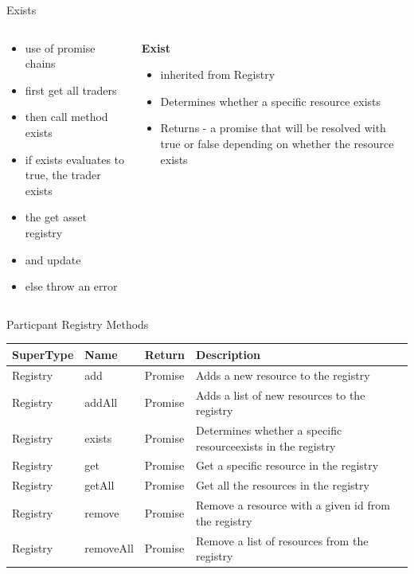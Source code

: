 \documentclass[pdf,table]{beamer}
\begin{document}
\begin{frame}{Exists}
	\begin{columns}[T]
		\begin{column}{0.48\textwidth}
			\begin{itemize}
				\item use of promise chains
				\item first get all traders
				\item then call method exists
				\item if exists evaluates to true, the trader exists
				\item the get asset registry 
				\item and update
				\item else throw an error
			\end{itemize}
		\end{column}
		\begin{column}{0.48\textwidth}
			{\bf Exist}
			\begin{itemize}
				\item inherited from Registry
				\item Determines whether a specific resource exists
				\item Returns - a promise that will be resolved with true or false depending on whether the resource exists
			\end{itemize}
		\end{column}
	\end{columns}	
\end{frame}

\begin{frame}{Particpant Registry Methods}
	\begin{tabular}{lllp{65mm}} \\
		SuperType & Name & Return & Description \\ \hline
		Registry & add & Promise & Adds a new resource to the registry \\ \hline
		Registry & addAll & Promise & Adds a list of new resources to the registry \\ \hline
		Registry & exists & Promise & Determines whether a specific resourceexists in the registry \\ \hline
		Registry & get & Promise & Get a specific resource in the registry \\ \hline
		Registry & getAll & Promise & Get all the resources in the registry \\ \hline
		Registry & remove & Promise & Remove a resource with a given id from the registry \\ \hline
		Registry & removeAll & Promise & Remove a list of resources from the registry \\ \hline
\end{tabular}
\end{frame}
\end{document}
